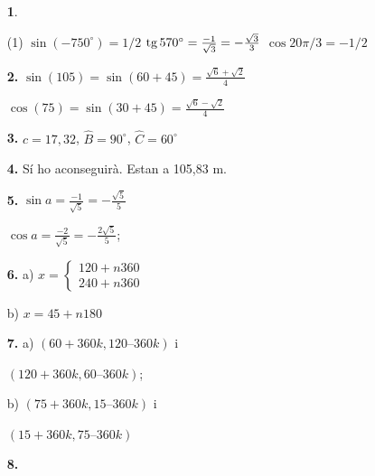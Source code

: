 \documentclass[a4paper, pdf, twoside]{book}
\begin{document}
\begin{multicols}{2}
\begin{enumerate}

 \item[\fontfamily{phv}\selectfont\color{blue}\textbf{1}. ]  \scalebox{0.6}{\simbolclau } 
 \begin{tasks}[column-sep=1em, item-indent=1.3333em](1)
	 \task $\sin (-750^\circ )=1/2$
	 \task* $\mathrm{tg}\, 570^\circ =\frac {-1}{\sqrt 3}=-\frac {\sqrt 3}{3}$
	 \task $\cos 20\pi /3 = -1/2$
\end{tasks}
\vspace{0.25cm}
\item[\fontfamily{phv}\selectfont\color{blue}\textbf{2. }]  \scalebox{0.6}{\simbolclau } 
$\sin (105)=\sin (60+45)=\frac {\sqrt {6}+\sqrt {2}}{4}$ \par $\cos (75)=\sin (30+45)=\frac {\sqrt {6}-\sqrt {2}}{4}$
\vspace{0.25cm}
\item[\fontfamily{phv}\selectfont\color{blue}\textbf{3. }]  \scalebox{0.6}{\simbolclau } 
$c=17,32$, $\hat B=90^\circ $, $\hat C=60^\circ $
\vspace{0.25cm}
\item[\fontfamily{phv}\selectfont\color{blue}\textbf{4. }]  \scalebox{0.6}{\simbolclau } 
Sí ho aconseguirà. Estan a 105,83 m.
\vspace{0.25cm}
\item[\fontfamily{phv}\selectfont\color{blue}\textbf{5. }]  \scalebox{0.6}{\simbolclau } 
$\sin a=\frac {-1}{\sqrt 5}=-\frac {\sqrt 5}{5}$\par $\cos a=\frac {-2}{\sqrt 5}=-\frac {2\sqrt 5}{5}$;
\vspace{0.25cm}
\item[\fontfamily{phv}\selectfont\color{blue}\textbf{6. }]  \scalebox{0.6}{\simbolclau } 
a) $x=\left \{\begin {array}{l} 120 + n 360 \\ 240 +n 360 \end {array}\right .$ \par b) $x=45 + n 180$
\vspace{0.25cm}
\item[\fontfamily{phv}\selectfont\color{blue}\textbf{7. }]  \scalebox{0.6}{\simbolclau } 
a) $(60+360k,120–360k)$ i \par $(120+360k,60–360k)$; \par b) $(75+360k, 15–360k)$ i \par $(15+360k, 75–360k)$
\vspace{0.25cm}
\item[\fontfamily{phv}\selectfont\color{blue}\textbf{8. }]  \scalebox{0.6}{\simbolclau } 

\end{enumerate}
\end{multicols}
\end{document}
